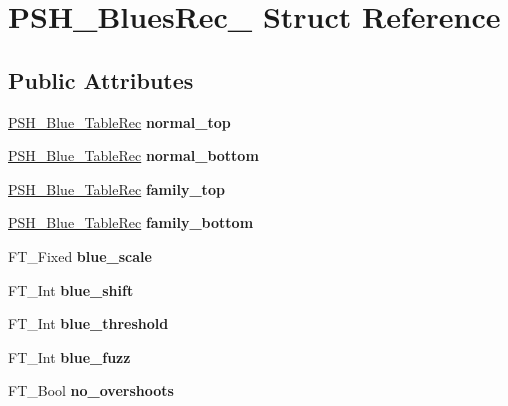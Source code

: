 \hypertarget{struct_p_s_h___blues_rec__}{}\section{P\+S\+H\+\_\+\+Blues\+Rec\+\_\+ Struct Reference}
\label{struct_p_s_h___blues_rec__}
\subsection*{Public Attributes}
\begin{DoxyCompactItemize}
\item 
\mbox{\label{struct_p_s_h___blues_rec___abd1fdcbf0cea8fc142cafb19c1ebfdc5}} 
\hyperlink{struct_p_s_h___blue___table_rec__}{P\+S\+H\+\_\+\+Blue\+\_\+\+Table\+Rec} {\bfseries normal\+\_\+top}
\item 
\mbox{\label{struct_p_s_h___blues_rec___aed54cd3e8fac122be75c69629cbf2165}} 
\hyperlink{struct_p_s_h___blue___table_rec__}{P\+S\+H\+\_\+\+Blue\+\_\+\+Table\+Rec} {\bfseries normal\+\_\+bottom}
\item 
\mbox{\label{struct_p_s_h___blues_rec___af081f2295931ffe85c35d5651807ceb0}} 
\hyperlink{struct_p_s_h___blue___table_rec__}{P\+S\+H\+\_\+\+Blue\+\_\+\+Table\+Rec} {\bfseries family\+\_\+top}
\item 
\mbox{\label{struct_p_s_h___blues_rec___a46a6039517019d284f67b6745e26570b}} 
\hyperlink{struct_p_s_h___blue___table_rec__}{P\+S\+H\+\_\+\+Blue\+\_\+\+Table\+Rec} {\bfseries family\+\_\+bottom}
\item 
\mbox{\label{struct_p_s_h___blues_rec___a03ed95abe74428a151d835e01e90e553}} 
F\+T\+\_\+\+Fixed {\bfseries blue\+\_\+scale}
\item 
\mbox{\label{struct_p_s_h___blues_rec___ae71354fd580c4d16e5d477d5915c225d}} 
F\+T\+\_\+\+Int {\bfseries blue\+\_\+shift}
\item 
\mbox{\label{struct_p_s_h___blues_rec___ab4e11c74720b6e47d60eceb2cb6c728a}} 
F\+T\+\_\+\+Int {\bfseries blue\+\_\+threshold}
\item 
\mbox{\label{struct_p_s_h___blues_rec___a3f1bbc8e8dc8c3ddec79c4adc5a55e54}} 
F\+T\+\_\+\+Int {\bfseries blue\+\_\+fuzz}
\item 
\mbox{\label{struct_p_s_h___blues_rec___a63d0b7f44d1188f908c2dc0e43a81d95}} 
F\+T\+\_\+\+Bool {\bfseries no\+\_\+overshoots}
\end{DoxyCompactItemize}


